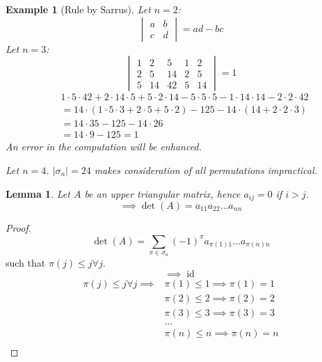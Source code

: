 \documentclass[a4paper]{article}
\newcounter{lecref}[section]
\numberwithin{lecref}{section}
\newtheorem*{Example}{Example}
\newtheorem{lemma}[lecref]{Lemma}
\newcommand{\card}[1]{\left|#1\right|}
\begin{document}
\begin{Example}[Rule by Sarrus]
  Let $n=2$:
  \[
    \begin{vmatrix} a & b \\ c & d \end{vmatrix} = ad - bc
  \]
  Let $n = 3$:
  \[
    \begin{vmatrix}
      1 & 2 & 5 & 1 & 2 \\
      2 & 5 & 14 & 2 & 5 \\
      5 & 14 & 42 & 5 & 14
    \end{vmatrix}
    = 1
  \]
  \begin{align*}
    &1 \cdot 5 \cdot 42 + 2 \cdot 14 \cdot 5 + 5 \cdot 2 \cdot 14 - 5 \cdot 5 \cdot 5 - 1 \cdot 14 \cdot 14 - 2 \cdot 2 \cdot 42 \\
      &= 14 \cdot (1 \cdot 5 \cdot 3 + 2 \cdot 5 + 5 \cdot 2) - 125 - 14 \cdot (14 + 2 \cdot 2 \cdot 3) \\
      &= 14 \cdot 35 - 125 - 14 \cdot 26 \\
      &= 14 \cdot 9 - 125 = 1
  \end{align*}
  An error in the computation will be enhanced.

  Let $n = 4$.
  $\card{\sigma_n} = 24$ makes consideration of all permutations impractical.
\end{Example}

\begin{lemma} %
  Let $A$ be an upper triangular matrix, hence $a_{ij} = 0$ if $i > j$.
  \[ \implies \det(A) = a_{11} a_{22} \dots a_{nn} \]
\end{lemma}
\begin{proof}
  \[ \det(A) = \sum_{\pi \in \sigma_n} (-1)^\pi a_{\pi(1) 1} \dots a_{\pi(n) n} \]
  such that $\pi(j) \leq j \forall j$.
  \[ \implies \operatorname{id} \]
  \begin{align*}
    \pi(j) \leq j \forall j \implies
      &\pi(1) \leq 1 \implies \pi(1) = 1 \\
      &\pi(2) \leq 2 \implies \pi(2) = 2 \\
      &\pi(3) \leq 3 \implies \pi(3) = 3 \\
      &\dots \\
      &\pi(n) \leq n \implies \pi(n) = n \\
  \end{align*}
\end{proof}
\end{document}
